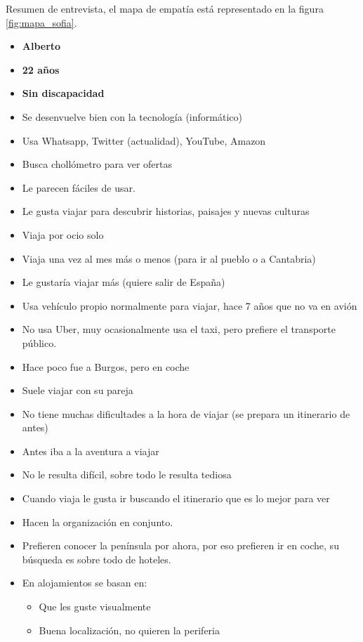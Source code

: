 Resumen de entrevista, el mapa de empatía está representado en la figura \ref{fig:mapa_sofia}.

\begin{itemize}
    \item \textbf{Alberto}
    \item \textbf{22 años}
    \item \textbf{Sin discapacidad}
    \item Se desenvuelve bien con la tecnología (informático)
    \item Usa Whatsapp, Twitter (actualidad), YouTube, Amazon
    \item Busca chollómetro para ver ofertas
    \item Le parecen fáciles de usar.
    \item Le gusta viajar para descubrir historias, paisajes y nuevas culturas
    \item Viaja por ocio solo
    \item Viaja una vez al mes más o menos (para ir al pueblo o a Cantabria)
    \item Le gustaría viajar más (quiere salir de España)
    \item Usa vehículo propio normalmente para viajar, hace 7 años que no va en avión
    \item No usa Uber, muy ocasionalmente usa el taxi, pero prefiere el transporte público.
    \item Hace poco fue a Burgos, pero en coche
    \item Suele viajar con su pareja
    \item No tiene muchas dificultades a la hora de viajar (se prepara un itinerario de antes)
    \item Antes iba a la aventura a viajar
    \item No le resulta difícil, sobre todo le resulta tediosa
    \item Cuando viaja le gusta ir buscando el itinerario que es lo mejor para ver
    \item Hacen la organización en conjunto.
    \item Prefieren conocer la península por ahora, por eso prefieren ir en coche, su búsqueda es sobre todo de hoteles.
    \item En alojamientos se basan en:
    \begin{itemize}
        \item Que les guste visualmente
        \item Buena localización, no quieren la periferia

\end{itemize}
\end{itemize}

